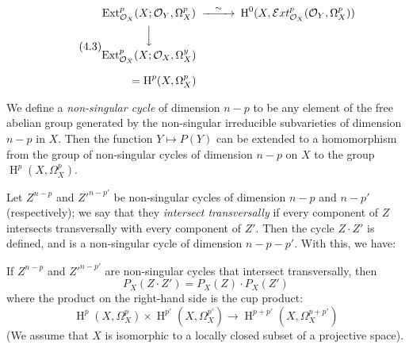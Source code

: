 \begin{equation}\tag{4.3}\label{fga1-equation-4.3}
  \begin{CD}
    \operatorname{Ext}_{\mathcal{O}_X}^p(X;\mathcal{O}_Y,\Omega_X^p) @>\sim>> \operatorname{H}^0(X,\mathcal{E}xt_{\mathcal{O}_X}^p(\mathcal{O}_Y,\Omega_X^p))
    \\@VVV
    \\\begin{aligned}
      \operatorname{Ext}_{\mathcal{O}_X}^p(X;\mathcal{O}_X,\Omega_X^y)
      \\=\operatorname{H}^p(X,\Omega_X^p)
    \end{aligned}
  \end{CD}
\end{equation}

We define a \emph{non-singular cycle} of dimension $n-p$ to be any element of the free abelian group generated by the non-singular irreducible subvarieties of dimension $n-p$ in $X$.
Then the function $Y\mapsto P(Y)$ can be extended to a homomorphism from the group of non-singular cycles of dimension $n-p$ on $X$ to the group $\operatorname{H}^p(X,\Omega_X^p)$.

Let $Z^{n-p}$ and $Z'^{n-p'}$ be non-singular cycles of dimension $n-p$ and $n-p'$ (respectively);
we say that they \emph{intersect transversally} if every component of $Z$ intersects transversally with every component of $Z'$.
Then the cycle $Z\cdot Z'$ is defined, and is a non-singular cycle of dimension $n-p-p'$.
With this, we have:

\begin{theorem}\label{fga1-theorem-1}
  If $Z^{n-p}$ and $Z'^{n-p'}$ are non-singular cycles that intersect transversally, then
  \begin{equation}\tag{4.4}\label{fga1-equation-4.4}
    P_X(Z\cdot Z') = P_X(Z)\cdot P_X(Z')
  \end{equation}
  where the product on the right-hand side is the cup product:
  \[\operatorname{H}^p(X,\Omega_X^p)\times\operatorname{H}^{p'}(X,\Omega_X^{p'}) \to \operatorname{H}^{p+p'}(X,\Omega_X^{p+p'})\]
  (We assume that $X$ is isomorphic to a locally closed subset of a projective space).
\end{theorem}

